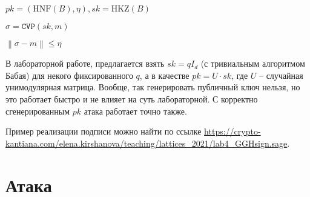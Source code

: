 \documentclass[11pt]{exam}
\theoremstyle{definition}
\newcommand{\Id}{\ensuremath{I}}
\newcommand*\norm[1]{\left\lVert#1\right\rVert}
\begin{document}
{	\begin{algorithm}
		\begin{algorithmic}[1]
			\State		\Return $pk = (\text{HNF}(B), \eta), sk = \text{HKZ}(B)$ 
			\EndFunction
			
			\vspace{10pt}
			\State \Return $\sigma = \mathtt{CVP}(sk, m)$
			\EndFunction
			
			\vspace{10pt}
			\State \Return $\norm{\sigma-m} \leq \eta$
			\EndFunction
		\end{algorithmic}
	\end{algorithm}
	
	В лабораторной работе, предлагается взять $sk = q \Id_d$ (с тривиальным алгоритмом Бабая) для некого фиксированного $q$, а в качестве $pk = U \cdot sk$, где $U$ -- случайная унимодулярная матрица.  Вообще, так генерировать публичный ключ нельзя, но это работает быстро и не влияет на суть лабораторной. С корректно сгенерированным $pk$ атака работает точно также.
	
	Пример реализации подписи можно найти по ссылке \url{https://crypto-kantiana.com/elena.kirshanova/teaching/lattices_2021/lab4\_GGHsign.sage}.
	
	
	
	\section{Атака}
	
}
\end{document}
